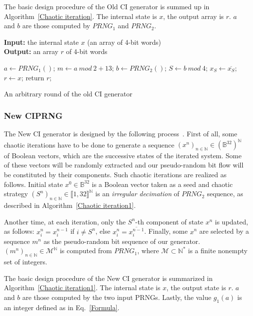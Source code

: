 \documentclass[10pt, conference, compsocconf]{IEEEtran}
\begin{document}
The basic design procedure of the Old CI generator is summed up in Algorithm~\ref{Chaotic iteration}.
The internal state is $x$, the output array is $r$. $a$ and $b$ are those computed by $PRNG_1$ and $PRNG_2$.


\begin{algorithm}
\textbf{Input:} the internal state $x$ (an array of 4-bit words)\\
\textbf{Output:} an array $r$ of 4-bit words
\begin{algorithmic}[1]

\STATE$a\leftarrow{PRNG_1()}$;
\STATE$m\leftarrow{a~mod~2+13}$;
\STATE$b\leftarrow{PRNG_2()}$;
\STATE$S\leftarrow{b~mod~4}$;
\STATE$x_S\leftarrow{ \overline{x_S}}$;
\ENDWHILE
\STATE$r\leftarrow{x}$;
\STATE return $r$;
\medskip
\caption{An arbitrary round of the old CI generator}
\label{Chaotic iteration}
\end{algorithmic}
\end{algorithm}

\subsubsection{New CIPRNG}

The New CI generator is designed by the following process~\cite{bg10:ip}. First of all, some chaotic iterations have to be done to generate a sequence $\left(x^n\right)_{n\in\mathds{N}} \in \left(\mathds{B}^{32}\right)^\mathds{N}$ of Boolean vectors, which are the successive states of the iterated system. Some of these vectors will be randomly extracted and our pseudo-random bit flow will be constituted by their components. Such chaotic iterations are realized as follows. Initial state $x^0 \in \mathds{B}^{32}$ is a Boolean vector taken as a seed and chaotic strategy $\left(S^n\right)_{n\in\mathds{N}}\in \llbracket 1, 32 \rrbracket^\mathds{N}$ is
an \emph{irregular decimation} of $PRNG_2$ sequence, as described in Algorithm~\ref{Chaotic iteration1}.

Another time, at each iteration, only the $S^n$-th component of state $x^n$ is updated, as follows: $x_i^n = x_i^{n-1}$ if $i \neq S^n$, else $x_i^n = \overline{x_i^{n-1}}$.
Finally, some $x^n$ are selected
by a sequence $m^n$ as the pseudo-random bit sequence of our generator.
$(m^n)_{n \in \mathds{N}} \in \mathcal{M}^\mathds{N}$ is computed from $PRNG_1$, where $\mathcal{M}\subset \mathds{N}^*$ is a finite nonempty set of integers.

The basic design procedure of the New CI generator is summarized in Algorithm~\ref{Chaotic iteration1}.
The internal state is $x$, the output state is $r$. $a$ and $b$ are those computed by the two input
PRNGs. Lastly, the value $g_1(a)$ is an integer defined as in Eq.~\ref{Formula}.
\end{document}
